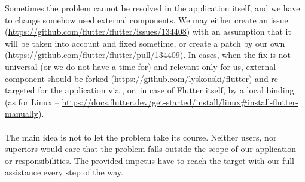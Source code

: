 \noindent Sometimes the problem cannot be resolved in the application itself, and we have to change somehow used 
external components. We may either create an issue 
(\href{https://github.com/flutter/flutter/issues/134408}{https://github.com/flutter/flutter/issues/134408}) 
with an assumption that it will be taken into account and fixed sometime, or create a patch by our own 
(\href{https://github.com/flutter/flutter/pull/134409}{https://github.com/flutter/flutter/pull/134409}). In cases, when 
the fix is not universal (or we do not have a time for) and relevant only for us, external component should be forked 
(\href{https://github.com/lyskouski/flutter}{https://github.com/lyskouski/flutter}) and re-targeted for the application
via , or, in case of Flutter itself, by a local binding (as for Linux -- 
\href{https://docs.flutter.dev/get-started/install/linux#install-flutter-manually}{https://docs.flutter.dev/get-started/install/linux\#install-flutter-manually}).\\
\\

\noindent The main idea is not to let the problem take its course. Neither users, nor superiors would care that the 
problem falls outside the scope of our application or responsibilities. The provided impetus have to reach the 
target with our full assistance every step of the way.
